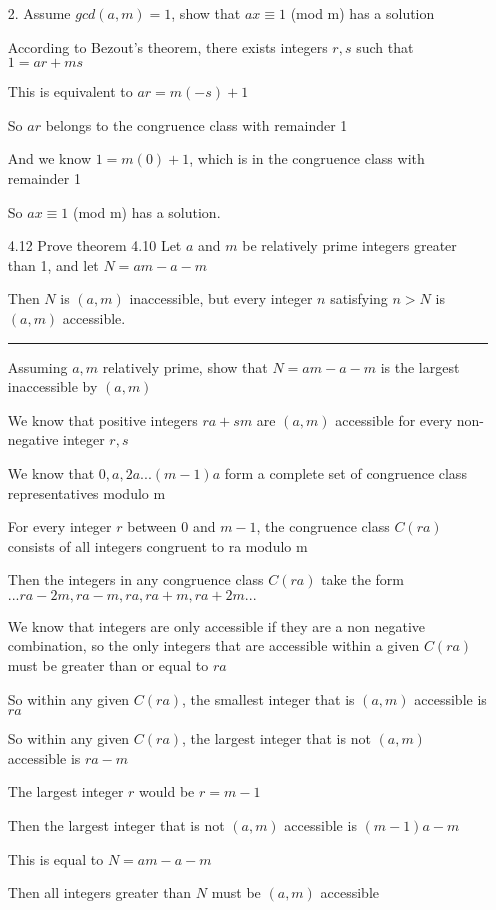 \documentclass[11pt]{article}
\begin{document}
\begin{itemize}
2. Assume $gcd(a,m) = 1$, show that $ax \equiv 1$ (mod m) has a solution

According to Bezout’s theorem, there exists integers $r,s$ such that $1 = ar + ms$

This is equivalent to $ar = m(-s) + 1$

So $ar$ belongs to the congruence class with remainder 1

And we know $1 = m(0) + 1$, which is in the congruence class with remainder 1

So $ax \equiv 1$ (mod m) has a solution.

\newpage

\item[4.12]
Prove theorem 4.10
Let $a$ and $m$ be relatively prime integers greater than 1, and let $N = am - a - m$

Then $N$ is $(a,m)$ inaccessible, but every integer $n$ satisfying $n > N$ is $(a,m)$ accessible.

\noindent\rule{2cm}{0.4pt}

Assuming $a,m$ relatively prime, show that $N = am - a - m$ is the largest inaccessible by $(a,m)$

We know that positive integers $ra + sm$ are $(a,m)$ accessible for every non-negative integer $r,s$

We know that $0, a, 2a ... (m-1)a$ form a complete set of congruence class representatives modulo m

For every integer $r$ between 0 and $m-1$, the congruence class $C(ra)$ consists of all integers congruent to ra modulo m

Then the integers in any congruence class $C(ra)$ take the form $...ra - 2m, ra - m, ra, ra + m, ra + 2m...$

We know that integers are only accessible if they are a non negative combination, so the only integers that are accessible within a given $C(ra)$ must be greater than or equal to $ra$

So within any given $C(ra)$, the smallest integer that is $(a,m)$ accessible is $ra$

So within any given $C(ra)$, the largest integer that is not $(a,m)$ accessible is $ra - m$

The largest integer $r$ would be $r = m - 1$

Then the largest integer that is not $(a,m)$ accessible is $(m-1)a - m$

This is equal to $N = am - a - m$

Then all integers greater than $N$ must be $(a,m)$ accessible


\end{itemize}
\end{document}
